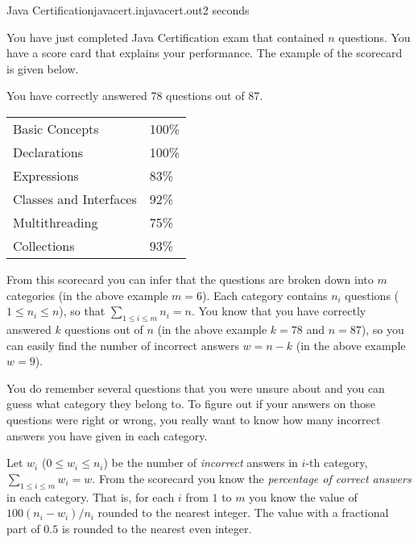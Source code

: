 \begin{problem}{Java Certification}{javacert.in}{javacert.out}{2 seconds}


You have just completed Java Certification exam that contained $n$ questions.
You have a score card that explains your performance. The example of the scorecard
is given below.
\begin{center}
You have correctly answered 78 questions out of 87. 

\begin{tabular}{|l|l|}
\hline
Basic Concepts         & 100\%  \\ %
Declarations           & 100\%  \\ %
Expressions            &  83\%  \\ %
Classes and Interfaces &  92\%  \\ %
Multithreading         &  75\%  \\ %
Collections            &  93\%  \\ %
\hline
\end{tabular}
\end{center}

From this scorecard you can infer that the questions are broken down into $m$ categories
(in the above example $m = 6$). Each category contains $n_i$ questions ($1 \le n_i \le n$), 
so that $\sum_{1 \le i \le m} n_i = n$. You know that you have correctly answered 
$k$ questions out of $n$ (in the above example $k = 78$ and $n = 87$), 
so you can easily find the number of incorrect answers $w = n - k$
(in the above example $w = 9$). 

You do remember several questions that you were unsure about and you can guess what category
they belong to. To figure out if your answers on those questions were right or wrong,
you really want to know how many incorrect answers you have given in each category. 

Let $w_i$ ($0 \le w_i \le n_i$) be the number of \emph{incorrect} answers in $i$-th category, $\sum_{1 \le i \le m} w_i = w$.
From the scorecard you know the \emph{percentage of correct answers} in each category.
That is, for each $i$ from $1$ to $m$ you know the value of $100(n_i - w_i) / n_i$
rounded to the nearest integer. The value with a fractional part of $0.5$ is 
rounded to the nearest even integer.


\end{problem}
